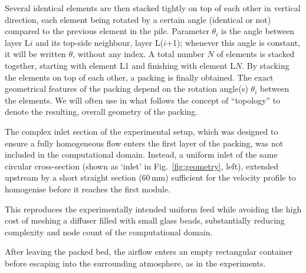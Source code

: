 Several identical elements are then stacked tightly on top of each other in vertical direction, each element being rotated by a certain angle (identical or not) compared to the previous element in the pile. Parameter $\theta_{i}$ is the angle between layer L$i$ and its top-side neighbour, layer L($i$+1); whenever this angle is constant, it will be written $\theta$, without any index. A total number $N$ of elements is stacked together, starting with element L1 and finishing with element L$N$. By stacking the elements on top of each other, a packing is finally obtained. The exact geometrical features of the packing depend on the rotation angle(s) $\theta_{i}$ between the elements. We will often use in what follows the concept of ``topology'' to denote the resulting, overall geometry of the packing.

The complex inlet section of the experimental setup, which was designed to ensure a fully homogeneous flow enters the first layer of the packing, was not included in the computational domain. Instead, a uniform inlet of the same circular cross-section (shown as `inlet' in Fig.~\ref{fig:geometry}, left), extended upstream by a short straight section ($60\,\mathrm{mm}$) sufficient for the velocity profile to homogenise before it reaches the first module.

This reproduces the experimentally intended uniform feed while avoiding the high cost of meshing a diffuser filled with small glass beads, substantially reducing complexity and node count of the computational domain.

After leaving the packed bed, the airflow enters an empty rectangular container before escaping into the surrounding atmosphere, as in the experiments.

